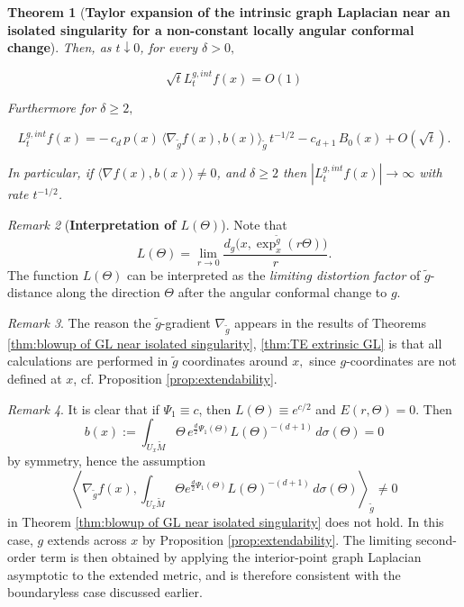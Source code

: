 \documentclass{amsart}
\newtheorem{theorem}{Theorem}[section]
\theoremstyle{definition}
\theoremstyle{remark}
\newtheorem{remark}[theorem]{Remark}
\newcommand{\nd}{\noindent}
\newcommand{\0}{\boldsymbol{0}}
\begin{document}
\begin{theorem}[\textbf{Taylor expansion of the intrinsic graph Laplacian near an isolated singularity for a non-constant locally angular conformal change}]
\nd Then, as $t\downarrow 0$, for every $\delta>0,$

\[\sqrt{t}L_t^{g, int}f(x)=O(1)\]

\nd Furthermore for $\delta \ge 2,$

\[
L_t^{g, int} f(x)
= -\,c_d\,p(x)\,\langle\nabla_{\tilde{g}} f(x),b(x)\rangle_{\tilde{g}}\,t^{-1/2}
  - c_{d+1}\,B_0(x)
  + O(\sqrt{t}).
\]

\nd In particular, if $\langle\nabla f(x),b(x)\rangle\neq 0$, and $\delta \ge 2$ then $|L_t^{g, int} f(x)|\to\infty$ with rate $t^{-1/2}$.
\end{theorem}

\begin{remark}[\textbf{Interpretation of $L(\Theta)$}] Note that 
\[ L(\Theta)=\lim_{r\to 0}\frac{d_g\bigl(x,\exp_x^{\tilde g}(r\Theta)\bigr)}{r}. \] The function $L(\Theta)$ can be interpreted as the \textit{limiting distortion factor} of $\tilde{g}$-distance along the direction $\Theta$ after the angular conformal change to $g.$
    
\end{remark}

\begin{remark}The reason the $\tilde{g}$-gradient $\nabla_{\tilde{g}}$ appears in the results of Theorems \ref{thm:blowup of GL near isolated singularity}, \ref{thm:TE extrinsic GL} is that all calculations are performed in $\tilde{g}$ coordinates around $x,$ since $g$-coordinates are not defined at $x$, cf. Proposition \ref{prop:extendability}.
    
\end{remark}

\begin{remark}
    It is clear that if $\Psi_1\equiv c$, then $L(\Theta)\equiv e^{c/2}$ and $E(r,\Theta)=0$. Then
    \[
    b(x):=\int_{U_x\widetilde{M}}\Theta \, e^{\frac{d}{2}\Psi_1(\Theta)}L(\Theta)^{-(d+1)}\, d \sigma(\Theta) =0
    \]
    by symmetry, hence the assumption
    \[
    \left\langle \nabla_{\tilde{g}}f(x),\int_{U_x\widetilde{M}}\Theta e^{\frac{d}{2}\Psi_1(\Theta)}L(\Theta)^{-(d+1)}\, d \sigma(\Theta) \right\rangle_{\tilde{g}} \ne 0
    \]
    in Theorem \ref{thm:blowup of GL near isolated singularity} does not hold. In this case, $g$ extends across $x$ by Proposition \ref{prop:extendability}. The limiting second-order term is then obtained by applying the interior-point graph Laplacian asymptotic to the extended metric, and is therefore consistent with the boundaryless case discussed earlier.
\end{remark}
\end{document}
